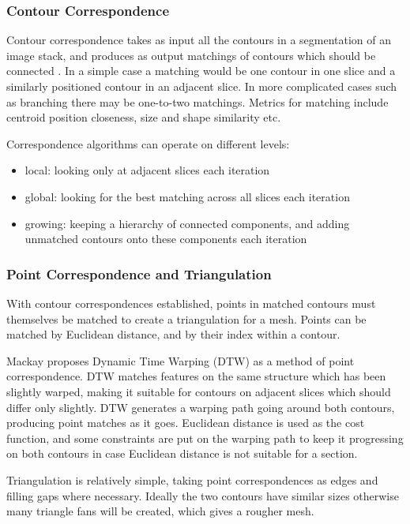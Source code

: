 \documentclass[10pt]{article}
\begin{document}
\subsubsection{Contour Correspondence}

Contour correspondence takes as input all the contours in a segmentation of an image stack, and produces as output matchings of contours which should be connected \cite{herbert2001contour}. In a simple case a matching would be one contour in one slice and a similarly positioned contour in an adjacent slice. In more complicated cases such as branching there may be one-to-two matchings. Metrics for matching include centroid position closeness, size and shape similarity etc.

Correspondence algorithms can operate on different levels:
\begin{itemize}
\item local: looking only at adjacent slices each iteration
\item global: looking for the best matching across all slices each iteration
\item growing: keeping a hierarchy of connected components, and adding unmatched contours onto these components each iteration
\end{itemize}

\subsubsection{Point Correspondence and Triangulation}

With contour correspondences established, points in matched contours must themselves be matched to create a triangulation for a mesh. Points can be matched by Euclidean distance, and by their index within a contour. 

Mackay \cite{mackay2019robust} proposes Dynamic Time Warping (DTW) as a method of point correspondence. DTW matches features on the same structure which has been slightly warped, making it suitable for contours on adjacent slices which should differ only slightly. DTW generates a warping path going around both contours, producing point matches as it goes. Euclidean distance is used as the cost function, and some constraints are put on the warping path to keep it progressing on both contours in case Euclidean distance is not suitable for a section.

Triangulation is relatively simple, taking point correspondences as edges and filling gaps where necessary. Ideally the two contours have similar sizes otherwise many triangle fans will be created, which gives a rougher mesh.
\end{document}
